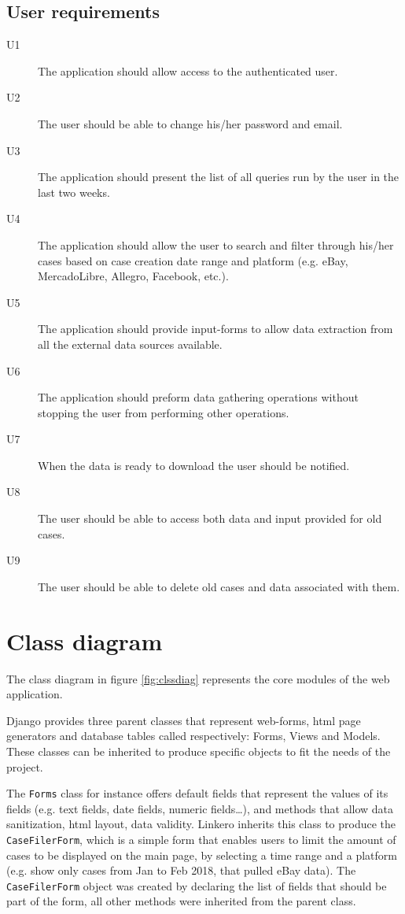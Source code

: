 \subsection{User requirements}
\begin{description}
\item[U1] The application should allow access to the authenticated user.
\item[U2] The user should be able to change his/her password and email.
\item[U3] The application should present the list of all queries run by the user
in the last two weeks.
\item[U4] The application should allow the user to search and filter through
his/her cases based on case creation date range and platform (e.g. eBay,
MercadoLibre, Allegro, Facebook, etc.).
\item[U5] The application should provide input-forms to allow data extraction
from all the external data sources available.
\item[U6] The application should preform data gathering operations without
stopping the user from performing other operations.
\item[U7] When the data is ready to download the user should be notified.
\item[U8] The user should be able to access both data and input provided for old
cases.
\item[U9] The user should be able to delete old cases and data associated with
them.
\end{description}

\section{Class diagram}
The class diagram in figure \ref{fig:clssdiag} represents the core modules of
the web application.

Django provides three parent classes that represent web-forms, html page
generators and database tables called respectively: Forms, Views and Models.
These classes can be inherited to produce specific objects to fit the needs of
the project.

The \texttt{Forms} class for instance offers default fields that represent the
values of its fields (e.g. text fields, date fields, numeric fields\ldots), and methods
that allow data sanitization, html layout, data validity. Linkero inherits this
class to produce the \texttt{CaseFilerForm}, which is a simple form that enables
users to limit the amount of cases to be displayed on the main page, by
selecting a time range and a platform (e.g. show only cases from Jan to Feb
2018, that pulled eBay data). The \texttt{CaseFilerForm} object was created by declaring
the list of fields that should be part of the form, all other methods were
inherited from the parent class.

